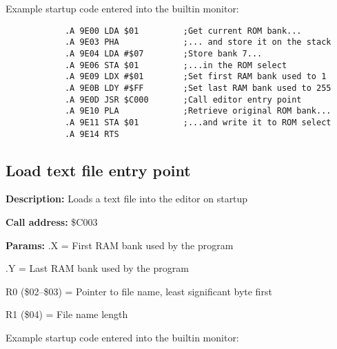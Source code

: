 \documentclass{article}
\begin{document}
        \vspace{1em}Example startup code entered into the builtin monitor:

        \begin{verbatim}
            .A 9E00 LDA $01         ;Get current ROM bank...
            .A 9E03 PHA             ;... and store it on the stack
            .A 9E04 LDA #$07        ;Store bank 7...
            .A 9E06 STA $01         ;...in the ROM select
            .A 9E09 LDX #$01        ;Set first RAM bank used to 1
            .A 9E0B LDY #$FF        ;Set last RAM bank used to 255
            .A 9E0D JSR $C000       ;Call editor entry point
            .A 9E10 PLA             ;Retrieve original ROM bank...
            .A 9E11 STA $01         ;...and write it to ROM select
            .A 9E14 RTS
        \end{verbatim}

    \subsection{Load text file entry point}

        \begin{hangparas}{3cm}{1}

            \textbf{Description:} \tabto{3cm} Loads a text file into the editor on startup

            \textbf{Call address:} \tabto{3cm}\$C003

            \textbf{Params:} \tabto{3cm}.X = First RAM bank used by the program
        
            \tabto{3cm} .Y = Last RAM bank used by the program

            \tabto{3cm} R0 (\$02--\$03) = Pointer to file name, least significant byte first

            \tabto{3cm} R1 (\$04) = File name length

        \end{hangparas}

        \vspace{1em}Example startup code entered into the builtin monitor:
\end{document}
